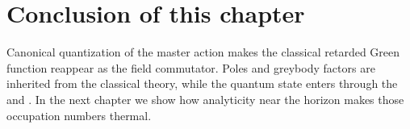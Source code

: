 \section{Conclusion of this chapter}

Canonical quantization of the master action makes the classical retarded Green function reappear as the field commutator. Poles and greybody factors are inherited from the classical theory, while the quantum state enters through the  and . In the next chapter we show how analyticity near the horizon makes those occupation numbers thermal.

